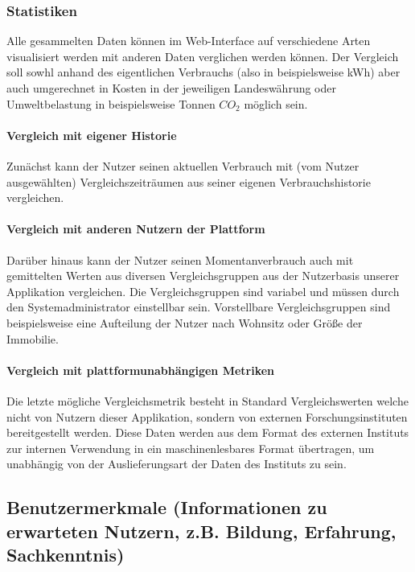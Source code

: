 \subsubsection{Statistiken}

Alle gesammelten Daten können im Web-Interface auf verschiedene Arten visualisiert werden mit anderen Daten verglichen werden können. Der Vergleich soll sowhl anhand des eigentlichen Verbrauchs (also in beispielsweise kWh) aber auch umgerechnet in Kosten in der jeweiligen Landeswährung oder Umweltbelastung in beispielsweise Tonnen $CO_2$ möglich sein.

\paragraph{Vergleich mit eigener Historie}

Zunächst kann der Nutzer seinen aktuellen Verbrauch  mit (vom Nutzer ausgewählten) Vergleichszeiträumen aus seiner eigenen Verbrauchshistorie vergleichen.


\paragraph{Vergleich mit anderen Nutzern der Plattform}
Darüber hinaus kann der Nutzer seinen Momentanverbrauch auch mit gemittelten Werten aus diversen Vergleichsgruppen aus der Nutzerbasis unserer Applikation vergleichen. Die Vergleichsgruppen sind variabel und müssen durch den Systemadministrator einstellbar sein. Vorstellbare Vergleichsgruppen sind beispielsweise eine Aufteilung der Nutzer nach Wohnsitz oder Größe der Immobilie.


\paragraph{Vergleich mit plattformunabhängigen Metriken}
\label{vgl_plattformunabhängig}

Die letzte mögliche Vergleichsmetrik besteht in Standard Vergleichswerten welche nicht von Nutzern dieser Applikation, sondern von externen Forschungsinstituten bereitgestellt werden. Diese Daten werden aus dem Format des externen Instituts zur internen Verwendung in ein maschinenlesbares Format übertragen, um unabhängig von der Auslieferungsart der Daten des Instituts zu sein.


\subsection{Benutzermerkmale (Informationen zu erwarteten Nutzern, z.B. Bildung, Erfahrung, Sachkenntnis)}

